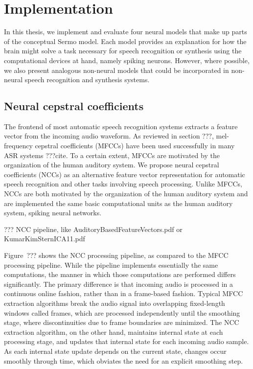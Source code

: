 \chapter{Implementation}

In this thesis, we implement and evaluate
four neural models that make up
parts of the conceptual Sermo model.
Each model provides
an explanation for how the brain might
solve a task necessary for
speech recognition or synthesis
using the computational devices at hand,
namely spiking neurons.
However, where possible,
we also present analogous non-neural models
that could be incorporated in
non-neural speech recognition and synthesis systems.

\section{Neural cepstral coefficients}


The frontend of most automatic speech recognition systems
extracts a feature vector from the incoming audio waveform.
As reviewed in section ???,
mel-frequency cepstral coefficients (MFCCs)
have been used successfully in many ASR systems ???cite.
To a certain extent, MFCCs are motivated
by the organization of the human auditory system.
We propose neural cepstral coefficients (NCCs)
as an alternative feature vector representation
for automatic speech recognition
and other tasks involving speech processing.
Unlike MFCCs, NCCs are both motivated
by the organization of the human auditory system
and are implemented the same basic computational units
as the human auditory system,
spiking neural networks.

??? NCC pipeline, like AuditoryBasedFeatureVectors.pdf
or KumarKimSternICA11.pdf

Figure~??? shows the NCC processing pipeline,
as compared to the MFCC processing pipeline.
While the pipeline implements
essentially the same computations,
the manner in which those computations
are performed differs significantly.
The primary difference is that
incoming audio is processed
in a continuous online fashion,
rather than in a frame-based fashion.
Typical MFCC extraction algorithms
break the audio signal into
overlapping fixed-length windows
called frames,
which are processed independently
until the smoothing stage,
where discontinuities
due to frame boundaries are
minimized.
The NCC extraction algorithm,
on the other hand,
maintains internal state
at each processing stage,
and updates that internal state
for each incoming audio sample.
As each internal state update
depends on the current state,
changes occur smoothly through time,
which obviates the need for
an explicit smoothing step.

